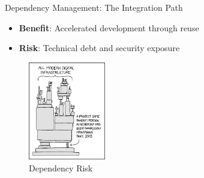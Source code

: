 \documentclass{beamer}
\begin{document}
\begin{frame}[t]{Dependency Management: The Integration Path}
\begin{itemize}
\item \textbf{Benefit}: Accelerated development through reuse
\item \textbf{Risk}: Technical debt and security exposure
\end{itemize}
    \begin{figure}
        \includegraphics[width=0.3\textwidth]{images/dependency.png}
        \caption{Dependency Risk}
    \end{figure}
\end{frame}
\end{document}
